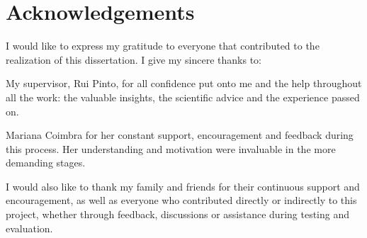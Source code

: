 \chapter*{Acknowledgements}

I would like to express my gratitude to everyone that contributed to the realization of this dissertation. I give my sincere thanks to:

My supervisor, Rui Pinto, for all confidence put onto me and the help throughout all the work: the valuable insights, the scientific advice and the experience passed on.

Mariana Coimbra for her constant support, encouragement and feedback during this process. Her understanding and motivation were invaluable in the more demanding stages.

I would also like to thank my family and friends for their continuous support and encouragement, as well as everyone who contributed directly or indirectly to this project, whether through feedback, discussions or assistance during testing and evaluation.

\vspace{10mm}
